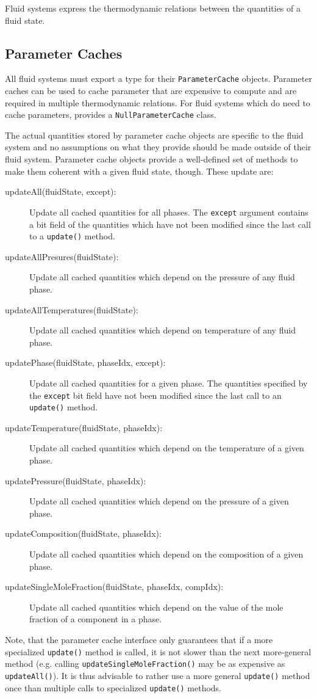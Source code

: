Fluid systems express the thermodynamic relations between the
quantities of a fluid state.

\subsection{Parameter Caches}

All fluid systems must export a type for their \texttt{ParameterCache}
objects. Parameter caches can be used to cache parameter that are
expensive to compute and are required in multiple thermodynamic
relations. For fluid systems which do need to cache parameters,
\Dumux provides a \texttt{NullParameterCache} class.

The actual quantities stored by parameter cache objects are specific
to the fluid system and no assumptions on what they provide should be
made outside of their fluid system. Parameter cache objects provide a
well-defined set of methods to make them coherent with a given fluid
state, though. These update are:
\begin{description}
\item[updateAll(fluidState, except):] Update all cached quantities for
  all phases. The \texttt{except} argument contains a bit field of the
  quantities which have not been modified since the last call to a
  \texttt{update()} method.
\item[updateAllPresures(fluidState):] Update all cached quantities
  which depend on the pressure of any fluid phase.
\item[updateAllTemperatures(fluidState):] Update all cached quantities
  which depend on temperature of any fluid phase.
\item[updatePhase(fluidState, phaseIdx, except):] Update all cached
  quantities for a given phase. The quantities specified by the
  \texttt{except} bit field have not been modified since the last call
  to an \texttt{update()} method.
\item[updateTemperature(fluidState, phaseIdx):] Update all cached
  quantities which depend on the temperature of a given phase.
\item[updatePressure(fluidState, phaseIdx):] Update all cached
  quantities which depend on the pressure of a given phase.
\item[updateComposition(fluidState, phaseIdx):] Update all cached
  quantities which depend on the composition of a given phase.
\item[updateSingleMoleFraction(fluidState, phaseIdx, compIdx):] Update
  all cached quantities which depend on the value of the mole fraction
  of a component in a phase.
\end{description}
Note, that the parameter cache interface only guarantees that if a
more specialized \texttt{update()} method is called, it is not slower
than the next more-general method (e.g. calling
\texttt{updateSingleMoleFraction()} may be as expensive as
\texttt{updateAll()}). It is thus advisable to rather use a more
general \texttt{update()} method once than multiple calls to
specialized \texttt{update()} methods.


